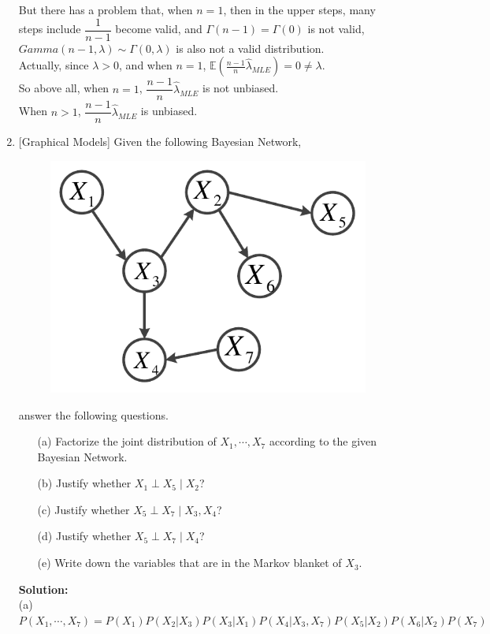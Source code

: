 \documentclass[10pt]{article}
\begin{document}
\begin{enumerate}[1.]
		  But there has a problem that, when $n=1$, then in the upper steps, many steps include $\dfrac{1}{n-1}$ become valid, and 
		  $\Gamma(n-1)=\Gamma(0)$ is not valid, $Gamma(n-1,\lambda)\sim\Gamma(0,\lambda)$ is also not a valid distribution.\\
		  Actually, since $\lambda>0$, and when $n=1$, $\mathbb{E}(\frac{n-1}{n}\hat{\lambda}_{MLE})=0\neq\lambda$.\\
		  
		  So above all, when $n=1$, $\dfrac{n-1}{n}\hat{\lambda}_{MLE}$ is not unbiased.\\
		  When $n>1$, $\dfrac{n-1}{n}\hat{\lambda}_{MLE}$ is unbiased.\\

      	  \newpage

	\item {} [Graphical Models]
	Given the following Bayesian Network, 
	\begin{figure}[h]
		\label{fig:bn}
		\vskip 0.2in
		\begin{center}
		\centerline{\includegraphics[width=0.4\columnwidth]{figures/bn}}
		\end{center}
		\vskip -0.2in
	\end{figure}

	answer the following questions.
		\begin{itemize}
			\item[(a)] Factorize the joint distribution of $X_{1},\cdots,X_{7}$ according 
			to the given Bayesian Network.~ 
			\item[(b)] Justify whether $X_{1}\perp X_{5}\mid X_{2}$?~ 
			\item[(c)] Justify whether $X_{5}\perp X_{7}\mid X_{3},X_{4}$?~ 
			\item[(d)] Justify whether $X_{5}\perp X_{7}\mid X_{4}$?~ 
			\item[(e)] Write down the variables that are in the Markov blanket of $X_{3}$.~ 
		\end{itemize}

		\textbf{Solution:}\\
		(a) $P(X_1,\cdots,X_7)=P(X_1)P(X_2|X_3)P(X_3|X_1)P(X_4|X_3,X_7)P(X_5|X_2)P(X_6|X_2)P(X_7)$\\


\end{enumerate}
\end{document}
